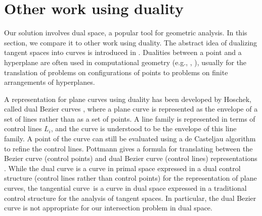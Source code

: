 \documentclass[9pt,twocolumn]{article}
\newcommand{\tang}{tangential curve\ }
\begin{document}
\section{Other work using duality}
\label{sec:duality}

Our solution involves dual space, a popular tool for geometric analysis.
In this section, we compare it to other work using duality.
The abstract idea of dualizing tangent spaces into curves
is introduced in \cite[p. 54]{hartshorne}.
Dualities between a point and a hyperplane
are often used in computational geometry
(e.g., \cite{edels87}, \cite[p. 214]{orourke94}),
usually for the translation of problems on configurations of points 
to problems on finite arrangements of hyperplanes.

A representation for plane curves using duality
has been developed by Hoschek, called dual Bezier curves \cite{hoschek83},
where a plane curve is represented as the envelope of a set of lines
rather than as a set of points.
A line family is represented in terms of control lines $L_i$,
and the curve is understood to be the envelope of this line family.
A point of the curve can still be evaluated using a de Casteljau algorithm
to refine the control lines.
Pottmann gives a formula for translating between the
Bezier curve (control points) and dual Bezier curve (control lines)
representations \cite{pottmann95}. %
While the dual curve is a curve in primal space expressed in a dual control structure (control lines rather than control points)
for the representation of plane curves,
the \tang is a curve in dual space expressed in a traditional control structure
for the analysis of tangent spaces.
In particular, the dual Bezier curve is not appropriate for our intersection
problem in dual space.
\end{document}
